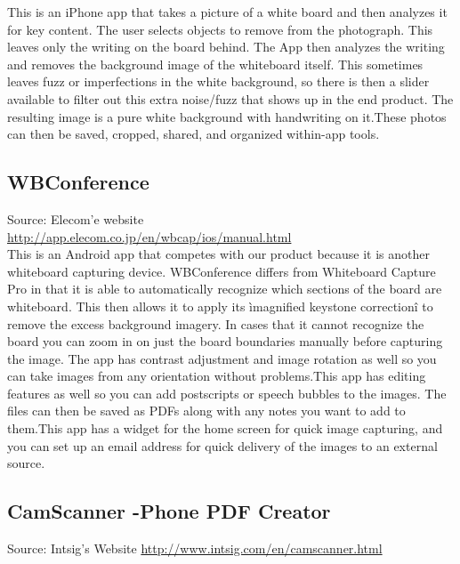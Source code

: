 \documentclass{article}
\begin{document}
This is an iPhone app that takes a picture of a white board and then analyzes it for key content. The user selects objects to remove from the photograph. This leaves only the writing on the board behind. The App then analyzes the writing and removes the background image of the whiteboard itself. This sometimes leaves fuzz or imperfections in the white background, so there is then a slider available to filter out this extra noise/fuzz that shows up in the end product. The resulting image is a pure white background with handwriting on it.These photos can then be saved, cropped, shared, and organized within-app tools. \\
				\subsection*{WBConference}
Source: Elecom'e website\\
{\color{red} \url{http://app.elecom.co.jp/en/wbcap/ios/manual.html}} \\
					
This is an Android app that competes with our product because it is another whiteboard capturing device. WBConference differs from Whiteboard Capture Pro in that it is able to automatically recognize which sections of the board are whiteboard. This then allows it to apply its ìmagnified keystone correctionî to remove the excess background imagery. In cases that it cannot recognize the board you can zoom in on just the board boundaries manually before capturing the image. The app has contrast adjustment and image rotation as well so you can take images from any orientation without problems.This app has editing features as well so you can add postscripts or speech bubbles to the images. The files can then be saved as PDFs along with any notes you want to add to them.This app has a widget for the home screen for quick image capturing, and you can set up an email address for quick delivery of the images to an external source. \\
				\subsection*{CamScanner -Phone PDF Creator}
Source: Intsig's Website
{\color{red} \url{http://www.intsig.com/en/camscanner.html}} \\
					
\end{document}
